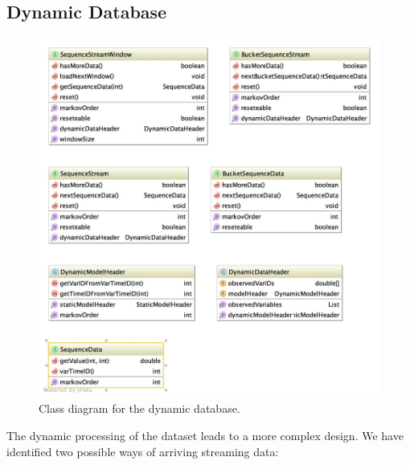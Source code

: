 \documentclass[a4paper,12pt]{article}
\begin{document}
\subsection{Dynamic Database}
\label{subsec:dynamicDatabase}
\begin{figure}
\includegraphics[width=\textwidth]{dynamicDB.jpg}
\caption{Class diagram for the dynamic database.}
\label{fig:dynamicDB}
\end{figure}

The dynamic processing of the dataset leads to a more complex design. We have identified two possible ways of arriving streaming data:
\end{document}
